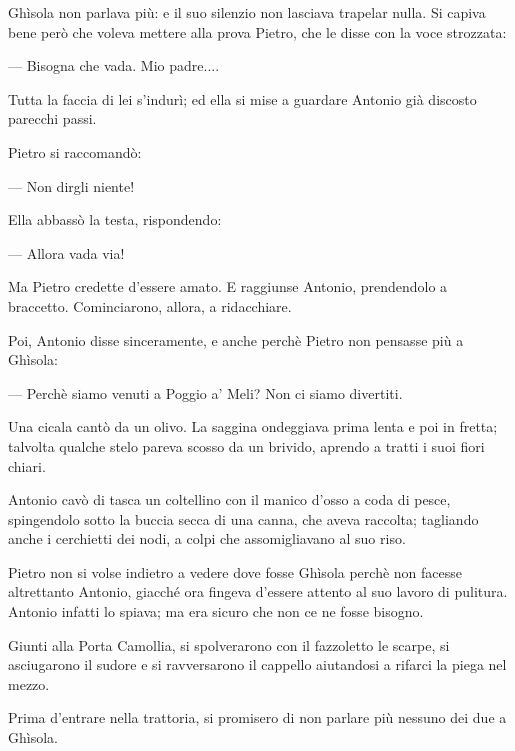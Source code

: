 Ghìsola non parlava più: e il suo silenzio non lasciava trapelar nulla. Si capiva bene però che voleva mettere alla prova Pietro, che le disse con la voce strozzata:

— Bisogna che vada. Mio padre....

Tutta la faccia di lei s'indurì; ed ella si mise a guardare Antonio già discosto parecchi passi.

Pietro si raccomandò:

— Non dirgli niente!

Ella abbassò la testa, rispondendo:

— Allora vada via!

Ma Pietro credette d'essere amato. E raggiunse Antonio, prendendolo a braccetto. Cominciarono, allora, a ridacchiare.

Poi, Antonio disse sinceramente, e anche perchè Pietro non pensasse più a Ghìsola:

— Perchè siamo venuti a Poggio a' Meli? Non ci siamo divertiti.

Una cicala cantò da un olivo. La saggina ondeggiava prima lenta e poi in fretta; talvolta qualche stelo pareva scosso da un brivido, aprendo a tratti i suoi fiori chiari.

Antonio cavò di tasca un coltellino con il manico d'osso a coda di pesce, spingendolo sotto la buccia secca di una canna, che aveva raccolta; tagliando anche i cerchietti dei nodi, a colpi che assomigliavano al suo riso.

Pietro non si volse indietro a vedere dove fosse Ghìsola perchè non facesse altrettanto Antonio, giacché ora fingeva d'essere attento al suo lavoro di pulitura. Antonio infatti lo spiava; ma era sicuro che non ce ne fosse bisogno.

Giunti alla Porta Camollia, si spolverarono con il fazzoletto le scarpe, si asciugarono il sudore e si ravversarono il cappello aiutandosi a rifarci la piega nel mezzo.

Prima d'entrare nella trattoria, si promisero di non parlare più nessuno dei due a Ghìsola.

